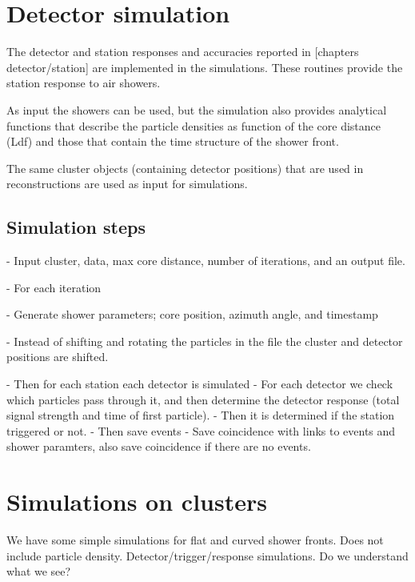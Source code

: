 \section{Detector simulation}

The detector and station responses and accuracies reported in [chapters
detector/station] are implemented in the simulations. These routines
provide the station response to air showers.

As input the \corsika showers can be used, but the simulation also
provides analytical functions that describe the particle densities as
function of the core distance (Ldf) and those that contain the time
structure of the shower front.

The same cluster objects (containing detector positions) that are used
in reconstructions are used as input for simulations.


\subsection{Simulation steps}

- Input cluster, \corsika data, max core distance, number of iterations, and an output file.

- For each iteration

- Generate shower parameters; core position, azimuth angle, and timestamp

- Instead of shifting and rotating the particles in the \corsika file
the cluster and detector positions are shifted.

- Then for each station each detector is simulated
- For each detector we check which particles pass through it, and then determine the detector response (total signal strength and time of first particle).
- Then it is determined if the station triggered or not.
- Then save events
- Save coincidence with links to events and shower paramters, also save
coincidence if there are no events.



\section{Simulations on clusters}

We have some simple simulations for flat and curved shower fronts.
Does not include particle density.
Detector/trigger/response simulations. Do we understand what we see?


